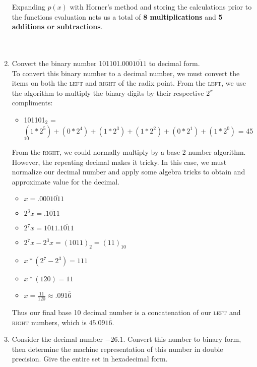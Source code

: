 \documentclass[12pt]{article}
\begin{document}
\begin{enumerate}
Expanding \(p(x)\) with Horner's method and storing the calculations prior to the functions evaluation nets us a total of \textbf{8 multiplications} and \textbf{5 additions or subtractions}.\\ \\ \\

	\item Convert the binary number 101101.000$\overline{1011}$ to decimal form. \\
	
	To convert this binary number to a decimal number, we must convert the items on both the \textsc{left} and \textsc{right} of the radix point. From the \textsc{left}, we use the algorithm to multiply the binary digits by their respective \(2^x\) compliments: 
	
	\begin{itemize}
		\item[] 101101$_2$ = $(1*2^5) + (0*2^4) + (1*2^3) + (1*2^2) + (0*2^1) + (1*2^0)$ = 45$_{10}$
	\end{itemize}
	
From the \textsc{right}, we could normally multiply by a base 2 number algorithm. However, the repeating decimal makes it tricky. In this case, we must normalize our decimal number and apply some algebra tricks to obtain and approximate value for the decimal.

	\begin{itemize}
		\item[] $x = .000\overline{1011}$
		\item[] $2^3x = .\overline{1011}$
		\item[] $2^7x = 1011.\overline{1011}$
		\item[] $2^7x - 2^3x = (1011)_2 = (11)_{10}$
		\item[] $x*(2^7 - 2^3) = 111$
		\item[] $x*(120)= 11$
		\item[] $x = \frac{11}{120} \approx .091\overline{6}$
	\end{itemize}
	
Thus our final base 10 decimal number is a concatenation of our \textsc{left} and \textsc{right} numbers, which is \textbf{$45.091\overline{6}$}.\\

	\item Consider the decimal number $-26.1$. Convert this number to binary form, then determine the machine representation of this number in double precision. Give the entire set in hexadecimal form. \\
	
	

\end{enumerate}
\end{document}
